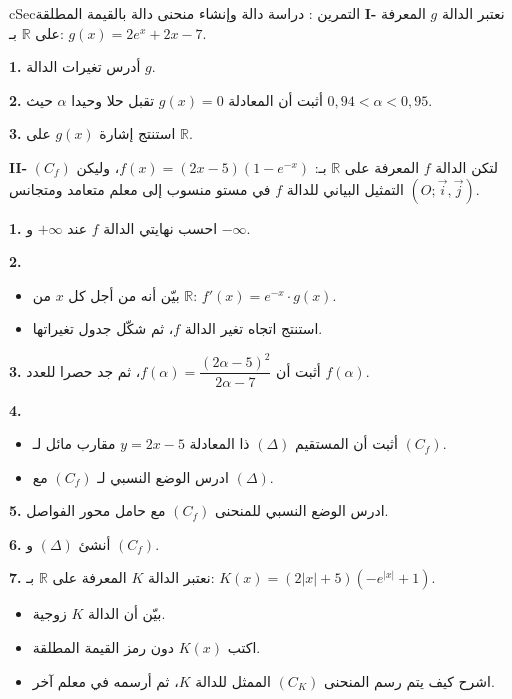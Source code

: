 \documentclass[12pt,a4paper]{article}
\newenvironment{BOX}[2]{\begin{otherlanguage}{english}\begin{arbox}{#1}{#2}}{\end{arbox}\end{otherlanguage}}
\newcounter{exo}
\newenvironment{tamrin}[1]{\stepcounter{exo}\begin{BOX}{cSec}{التمرين \theexo: #1}}{\end{BOX}}
\newcommand{\R}{\mathbb{R}}
\newenvironment{sq}{\begin{itemize}[leftmargin=2.4em,itemsep=3pt]}{\end{itemize}}
\newcommand{\qa}{\item[(أ)]}\newcommand{\qb}{\item[(ب)]}\newcommand{\qc}{\item[(جـ)]}\newcommand{\qd}{\item[(د)]}\newcommand{\qe}{\item[(هـ)]}
\newcommand{\QQ}[1]{\par\smallskip\textbf{#1.} }
\begin{document}
\begin{tamrin}{دراسة دالة وإنشاء منحنى دالة بالقيمة المطلقة}
\textbf{I-} نعتبر الدالة $g$ المعرفة على $\R$ بـ: $g(x)=2e^{x}+2x-7$.
\QQ{1} أدرس تغيرات الدالة $g$.
\QQ{2} أثبت أن المعادلة $g(x)=0$ تقبل حلا وحيدا $\alpha$ حيث $0{,}94<\alpha<0{,}95$.
\QQ{3} استنتج إشارة $g(x)$ على $\R$.

\textbf{II-} لتكن الدالة $f$ المعرفة على $\R$ بـ: $f(x)=(2x-5)\left(1-e^{-x}\right)$، وليكن $(C_f)$ التمثيل البياني للدالة $f$ في مستو منسوب إلى معلم متعامد ومتجانس $\left(O;\vec i,\vec j\right)$.
\QQ{1} احسب نهايتي الدالة $f$ عند $+\infty$ و $-\infty$.
\QQ{2} \begin{sq}
\qa بيّن أنه من أجل كل $x$ من $\R$: $f'(x)=e^{-x}\cdot g(x)$.
\qb استنتج اتجاه تغير الدالة $f$، ثم شكّل جدول تغيراتها.
\end{sq}
\QQ{3} أثبت أن $f(\alpha)=\dfrac{(2\alpha-5)^{2}}{2\alpha-7}$، ثم جد حصرا للعدد $f(\alpha)$.
\QQ{4} \begin{sq}
\qa أثبت أن المستقيم $(\Delta)$ ذا المعادلة $y=2x-5$ مقارب مائل لـ $(C_f)$.
\qb ادرس الوضع النسبي لـ $(C_f)$ مع $(\Delta)$.
\end{sq}
\QQ{5} ادرس الوضع النسبي للمنحنى $(C_f)$ مع حامل محور الفواصل.
\QQ{6} أنشئ $(\Delta)$ و $(C_f)$.
\QQ{7} نعتبر الدالة $K$ المعرفة على $\R$ بـ: $K(x)=\left(2|x|+5\right)\left(-e^{|x|}+1\right)$.
\begin{sq}
\qa بيّن أن الدالة $K$ زوجية.
\qb اكتب $K(x)$ دون رمز القيمة المطلقة.
\qc اشرح كيف يتم رسم المنحنى $(C_K)$ الممثل للدالة $K$، ثم أرسمه في معلم آخر.
\end{sq}
\end{tamrin}
\end{document}
